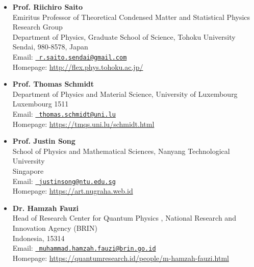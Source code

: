 \begin{itemize}

\item {\bf Prof. Riichiro Saito}\\
  Emiritus Professor of Theoretical Condensed Matter and
  Statistical Physics Research Group\\
  Department of Physics, Graduate
  School of Science, Tohoku University\\
  Sendai, 980-8578, Japan\\
  Email: \href{mailto:r.saito.sendai@gmail.com}{\tt
    r.saito.sendai@gmail.com} \\
  Homepage:
  \href{http://flex.phys.tohoku.ac.jp/}{\url{http://flex.phys.tohoku.ac.jp/}}
\item {\bf Prof. Thomas Schmidt}\\
  Department of Physics and Material Science, 
  University of Luxembourg\\
  Luxembourg 1511\\
  Email: \href{mailto:thomas.schmidt@uni.lu}{\tt
    thomas.schmidt@uni.lu} \\
  Homepage:
  \href{https://tmqs.uni.lu/schmidt.html}{\url{https://tmqs.uni.lu/schmidt.html}}
\item {\bf Prof. Justin Song}\\
  School of Physics and Mathematical Sciences, 
  Nanyang Technological University\\
  Singapore\\
  Email: \href{mailto:justinsong@ntu.edu.sg}{\tt
    justinsong@ntu.edu.sg} \\
  Homepage:
  \href{https://art.nugraha.web.id}{\url{https://art.nugraha.web.id}}
\item {\bf Dr. Hamzah Fauzi}\\
  Head of Research Center for Quantum Physics , 
  National Research and Innovation Agency (BRIN)\\
  Indonesia, 15314\\
  Email: \href{mailto:muhammad.hamzah.fauzi@brin.go.id}{\tt
    muhammad.hamzah.fauzi@brin.go.id} \\
  Homepage:
  \href{https://quantumresearch.id/people/m-hamzah-fauzi.html}{\url{https://quantumresearch.id/people/m-hamzah-fauzi.html}}

  
\end{itemize}


